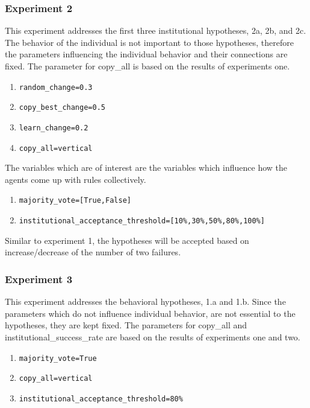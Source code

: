 \documentclass[a4paper]{article}
\begin{document}
\subsubsection{Experiment 2}
This experiment addresses the first three institutional hypotheses, 2a, 2b, and 2c. The behavior of 
the individual is not important to those hypotheses, therefore the parameters influencing the 
individual behavior and their connections are fixed. The parameter for copy\_all is 
based on the results of experiments one.
\begin{enumerate}
 \item \begin{alltt}random_change  = 0.3\end{alltt}
 \item \begin{alltt}copy_best_change = 0.5\end{alltt}
 \item \begin{alltt}learn_change = 0.2\end{alltt}
 \item \begin{alltt}copy_all = vertical\end{alltt}
\end{enumerate}


The variables which are of interest are the variables which influence how the agents come up with rules collectively. 

\begin{enumerate}
 \item \begin{alltt}majority_vote = [True, False]\end{alltt}
 \item \begin{alltt}institutional_acceptance_threshold = [10 \%, 30 \%, 50 \%, 80\% ,100\%] \end{alltt}
\end{enumerate}
Similar to experiment 1, the hypotheses will be accepted based on increase/decrease of the number of two failures.

\subsubsection{Experiment 3}
This experiment addresses the behavioral hypotheses, 1.a and 1.b. Since the parameters which do 
not influence individual behavior, are not essential to the hypotheses, they are kept fixed. 
The parameters for copy\_all and institutional\_success\_rate 
are based on the results of experiments one and two.
\begin{enumerate}
 \item \begin{alltt}majority_vote = True\end{alltt}
 \item \begin{alltt}copy_all = vertical \end{alltt}
 \item \begin{alltt}institutional_acceptance_threshold = 80 \%\end{alltt}
\end{enumerate}
\end{document}
